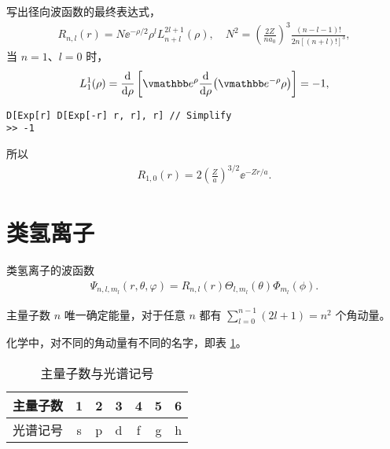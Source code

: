 写出径向波函数的最终表达式，
\begin{align}
    R_{n,l} (r) = N \ee^{-\rho/2} \rho^l L^{2l+1}_{n+l}(\rho), 
    \quad N^2 = \left(\frac{2Z}{na_0}\right)^3 \frac{(n-l-1)!}{2n[(n+l)!]^3},
\end{align}
当 $n = 1$、$l=0$ 时，
\begin{align}
    L_1^1 (\rho) = \dv{\rho} \left[
        \ee^{\rho} \dv{\rho} (\ee^{-\rho}\rho)
    \right] = -1,
\end{align}
\begin{lstlisting}
D[Exp[r] D[Exp[-r] r, r], r] // Simplify
>> -1
\end{lstlisting}
所以
\begin{align}
    R_{1,0} (r) = 2 \left(\frac Za\right)^{3/2} \ee^{-Zr/a}. 
\end{align}

\section{类氢离子}
类氢离子的波函数
\begin{align}
    \Psi_{n,l,m_l}(r,\theta,\varphi) = R_{n,l}(r) \Theta_{l,m_l}(\theta) \Phi_{m_l}(\phi).
\end{align}

主量子数 $n$ 唯一确定能量，对于任意 $n$ 都有 $\sum_{l=0}^{n-1} (2l+1) = n^2$ 个角动量。

化学中，对不同的角动量有不同的名字，即表 \ref{tab:spdf}。
\begin{table}[ht]
    \centering
    \caption{主量子数与光谱记号}
    \begin{tabular}[t]{ccccccc}
    \toprule
    主量子数 & 1&2&3&4&5&6\\
    \midrule
    光谱记号 & s&p&d&f&g&h\\
    \bottomrule
    \end{tabular}
    \label{tab:spdf}
    \end{table}%

